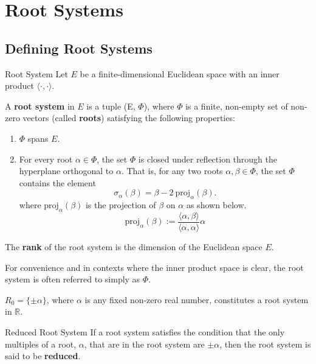 \chapter{Root Systems}
\section{Defining Root Systems}

\begin{nameddefinition}{Root System}
    Let $E$ be a finite-dimensional Euclidean space with an inner product $\langle \cdot, \cdot \rangle$. \newline
    
    A \textbf{root system} in $E$ is a tuple (E, $\Phi$), where $\Phi$ is a finite, non-empty set of non-zero vectors (called \textbf{roots}) satisfying the following properties:
    \begin{enumerate}[label=(R{\arabic*})]
        \item $\Phi$ spans $E$.
        \item For every root $\alpha \in \Phi$, the set $\Phi$ is closed under reflection through the hyperplane orthogonal to $\alpha$.
        That is, for any two roots $\alpha, \beta \in \Phi$, the set $\Phi$ contains the element
        \begin{equation*}
            \sigma_\alpha(\beta) = \beta - 2 \ \text{proj}_{\alpha}(\beta).
        \end{equation*}
        where $\text{proj}_{\alpha}(\beta)$ is the projection of $\beta$ on $\alpha$ as shown below.
        \begin{equation*}
            \text{proj}_{\alpha}(\beta) := \frac{ \langle \alpha, \beta \rangle}{\langle \alpha, \alpha \rangle} \alpha
        \end{equation*}
    \end{enumerate}

    The \textbf{rank} of the root system is the dimension of the Euclidean space $E$.
\end{nameddefinition}

For convenience and in contexts where the inner product space is clear, the root system is often referred to simply as $\Phi$.

\begin{example}
    $R_0 = \{\pm \alpha\}$, where $\alpha$ is any fixed non-zero real number, constitutes a root system in $\mathbb{R}$.
\end{example}

\begin{nameddefinition}{Reduced Root System}
    If a root system satisfies the condition that the only multiples of a root, $\alpha$, that are in the root system are $\pm \alpha$, then the root system is said to be \textbf{reduced}.
\end{nameddefinition}

